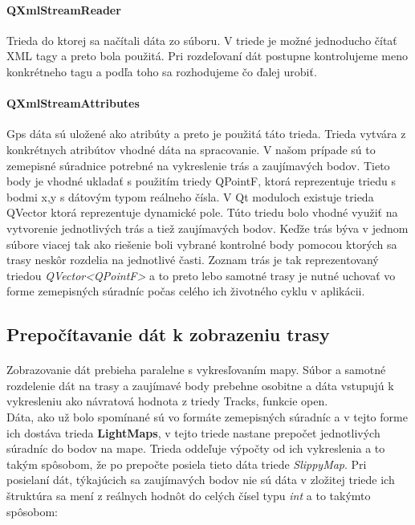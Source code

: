 \paragraph{QXmlStreamReader}
Trieda do ktorej sa načítali dáta zo súboru. V triede je možné jednoducho čítať XML tagy a preto bola použitá. Pri rozdeľovaní dát postupne kontrolujeme meno konkrétneho tagu a podľa toho sa rozhodujeme čo ďalej urobiť. 
\paragraph{QXmlStreamAttributes}
Gps dáta sú uložené ako atribúty a preto je použitá táto trieda. Trieda vytvára z konkrétnych atribútov vhodné dáta na spracovanie. V našom prípade sú to zemepisné súradnice potrebné na vykreslenie trás a zaujímavých bodov. Tieto body je vhodné ukladať s použitím triedy QPointF, ktorá reprezentuje triedu s bodmi x,y s dátovým typom reálneho čísla. V Qt moduloch existuje trieda QVector ktorá reprezentuje dynamické pole. Túto triedu bolo vhodné využiť na vytvorenie jednotlivých trás a tiež zaujímavých bodov. Keďže trás býva v jednom súbore viacej tak ako riešenie boli vybrané kontrolné body pomocou ktorých sa trasy neskôr rozdelia na jednotlivé časti. 
Zoznam trás je tak reprezentovaný triedou \textit{QVector<QPointF>} a to preto lebo samotné trasy je nutné uchovať vo forme zemepisných súradníc počas celého ich životného cyklu v aplikácii.

\subsection{Prepočítavanie dát k zobrazeniu trasy}
\paragraph{}
Zobrazovanie dát prebieha paralelne s vykresľovaním mapy. Súbor a samotné rozdelenie dát na trasy a zaujímavé body prebehne osobitne a dáta vstupujú k vykresleniu ako návratová hodnota z triedy Tracks, funkcie open.\\
Dáta, ako už bolo spomínané sú vo formáte zemepisných súradníc a v tejto forme ich dostáva trieda \textbf{LightMaps}, v tejto triede nastane prepočet jednotlivých súradníc do bodov na mape. Trieda oddeľuje výpočty od ich vykreslenia a to takým spôsobom, že po prepočte posiela tieto dáta triede \textit{SlippyMap}. Pri posielaní dát, týkajúcich sa zaujímavých bodov nie sú dáta v zložitej triede ich štruktúra sa mení z reálnych hodnôt do celých čísel typu \textit{int} a to takýmto spôsobom:\\

